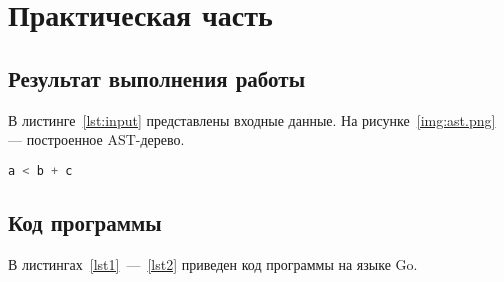 \section{Практическая часть}

\subsection{Результат выполнения работы}

В листинге~\ref{lst:input} представлены входные данные. На рисунке~\ref{img:ast.png} --- построенное AST-дерево.

\begin{lstlisting}[language=Go, caption={Входная программа}, label=lst:input]
a < b + c
\end{lstlisting}


\subsection{Код программы}

В листингах~\ref{lst1}~---~\ref{lst2} приведен код программы на языке Go.

